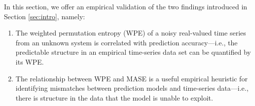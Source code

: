 


In this section, we offer an empirical validation of the two findings
introduced in Section \ref{sec:intro}, namely:

\begin{enumerate}

\item The weighted permutation entropy (WPE) of a noisy real-valued
  time series from an unknown system is correlated with prediction
  accuracy---i.e., the predictable structure in an empirical
  time-series data set can be quantified by its WPE.

\item The relationship between WPE and MASE is a useful empirical
  heuristic for identifying mismatches between prediction models and
  time-series data---i.e., there is structure in the data that the
  model is unable to exploit.

\end{enumerate}






